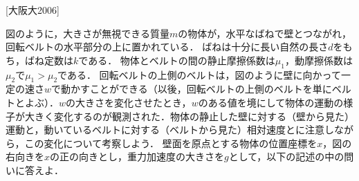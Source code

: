 


\noindent
{} [大阪大2006]

図のように，大きさが無視できる質量$m$の物体が，水平なばねで壁とつながれ，回転ベルトの水平部分の上に置かれている．
ばねは十分に長い自然の長さ$d$をもち，ばね定数は$k$である．
物体とベルトの間の静止摩擦係数は$\mu_1$，動摩擦係数は$\mu_2$で$\mu_1 > \mu_2$である．
回転ベルトの上側のベルトは，図のように壁に向かって一定の速さ$w$で動かすことができる（以後，回転ベルトの上側のベルトを単にベルトとよぶ）．$w$の大きさを変化させたとき，$w$のある値を境にして物体の運動の様子が大きく変化するのが観測された．物体の静止した壁に対する（壁から見た）運動と，動いているベルトに対する（ベルトから見た）相対速度とに注意しながら，この変化について考察しよう．
壁面を原点とする物体の位置座標を$x$，図の右向きを$x$の正の向きとし，重力加速度の大きさを$g$として，以下の記述の中の問いに答えよ．

